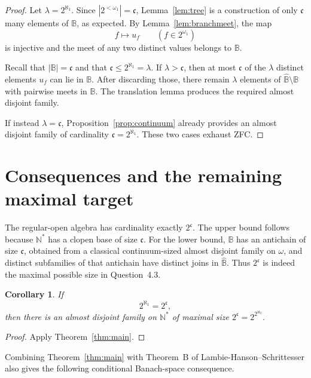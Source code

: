 \documentclass[11pt]{article}
\newtheorem{corollary}[theorem]{Corollary}
\theoremstyle{definition}
\theoremstyle{remark}
\newcommand{\B}{\mathbb B}
\newcommand{\wideB}{\widehat{\mathbb B}}
\begin{document}
\begin{proof}
Let \(\lambda=2^{\aleph_1}\).  Since
\(|2^{<\omega_1}|=\mathfrak c\), Lemma~\ref{lem:tree} is a construction of
only \(\mathfrak c\) many elements of \(\B\), as expected.  By
Lemma~\ref{lem:branchmeet}, the map
\[
  f\longmapsto u_f
  \qquad(f\in2^{\omega_1})
\]
is injective and the meet of any two distinct values belongs to \(\B\).

Recall that \(|\B|=\mathfrak c\) and that
\(\mathfrak c\leq2^{\aleph_1}=\lambda\).  If \(\lambda>\mathfrak c\), then
at most \(\mathfrak c\) of the \(\lambda\) distinct elements \(u_f\) can lie
in \(\B\).  After discarding those, there remain \(\lambda\) elements of
\(\wideB\setminus\B\) with pairwise meets in \(\B\).  The translation lemma
produces the required almost disjoint family.

If instead \(\lambda=\mathfrak c\), Proposition~\ref{prop:continuum} already
provides an almost disjoint family of cardinality
\(\mathfrak c=2^{\aleph_1}\).  These two cases exhaust ZFC.
\end{proof}

\section{Consequences and the remaining maximal target}

The regular-open algebra has cardinality exactly \(2^{\mathfrak c}\).  The
upper bound follows because \(\mathbb N^*\) has a clopen base of size
\(\mathfrak c\).  For the lower bound, \(\B\) has an antichain of size
\(\mathfrak c\), obtained from a classical continuum-sized almost disjoint
family on \(\omega\), and distinct subfamilies of that antichain have distinct
joins in \(\wideB\).  Thus \(2^{\mathfrak c}\) is indeed the maximal possible
size in Question~4.3.

\begin{corollary}\label{cor:maximal-equality}
If
\[
  2^{\aleph_1}=2^{\mathfrak c},
\]
then there is an almost disjoint family on \(\mathbb N^*\) of maximal size
\(2^{\mathfrak c}=2^{2^{\aleph_0}}\).
\end{corollary}

\begin{proof}
Apply Theorem~\ref{thm:main}.
\end{proof}

Combining Theorem~\ref{thm:main} with Theorem~B of
Lambie-Hanson--Schrittesser also gives the following conditional Banach-space
consequence.
\end{document}
